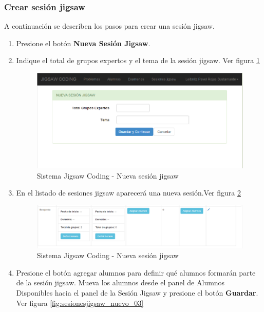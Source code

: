 \subsubsection{Crear sesión jigsaw}
A continuación se describen los pasos para crear una sesión jigsaw.
\begin{enumerate}
	\item Presione el botón \textbf{Nueva Sesión Jigsaw}.
	\item Indique el total de grupos expertos y el tema de la sesión jigsaw. Ver figura \ref{fig:sesionesjigsaw_nuevo_01}
	\begin{figure}[h!]
	\centering
	\caption[SJC Sesiones jigsaw]{Sistema Jigsaw Coding - Nueva sesión jigsaw}
	\label{fig:sesionesjigsaw_nuevo_01}
	\includegraphics[scale=0.5]{figuras/usodelsistema/docente/sesionesjigsaw_nuevo_01}
	\end{figure}
	\item En el listado de sesiones jigsaw aparecerá una nueva sesión.Ver figura \ref{fig:sesionesjigsaw_nuevo_02}
	\begin{figure}[h!]
	\centering
	\caption[SJC Sesiones Jigsaw]{Sistema Jigsaw Coding - Nueva sesión jigsaw}
	\label{fig:sesionesjigsaw_nuevo_02}
	\includegraphics[scale=0.5]{figuras/usodelsistema/docente/sesionesjigsaw_nuevo_02}
	\end{figure}
	\item Presione el botón agregar alumnos para definir qué alumnos formarán parte de la sesión jigsaw. Mueva los alumnos desde el panel de Alumnos Disponibles hacia el panel de la Sesión Jigsaw y presione el botón \textbf{Guardar}.  Ver figura \ref{fig:sesionesjigsaw_nuevo_03}

\end{enumerate}
